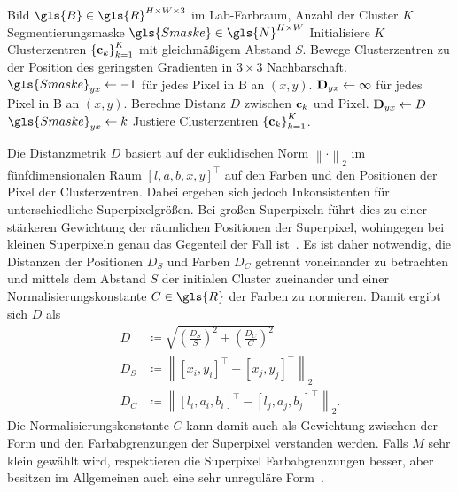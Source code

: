 \begin{algorithm}[t]
\centering
\begin{algorithmic}
  \REQUIRE{} Bild $\gls{B} \in \gls{R}^{H \times W \times 3}$ im Lab-Farbraum, Anzahl der Cluster $K$
  \ENSURE{} Segmentierungsmaske $\gls{Smaske} \in \gls{N}^{H \times W}$
  \STATE{} Initialisiere $K$ Clusterzentren ${\left\{\ve{c}_k\right\}}_{k=1}^K$ mit gleichmäßigem Abstand $S$.
  \STATE{} Bewege Clusterzentren zu der Position des geringsten Gradienten in $3 \times 3$ Nachbarschaft.
  \STATE{} $\gls{Smaske}_{yx} \leftarrow -1$ für jedes Pixel in \gls{B} an $\left(x,y\right)$.
  \STATE{} $\mathbf{D}_{yx} \leftarrow \infty$ für jedes Pixel in \gls{B} an $\left(x,y\right)$.
  \REPEAT{}
        \STATE{} Berechne Distanz $D$ zwischen $\mathbf{c}_k$ und Pixel.
          \STATE{} $\mathbf{D}_{yx} \leftarrow D$
          \STATE{} $\gls{Smaske}_{yx} \leftarrow k$
        \ENDIF{}
      \ENDFOR{}
    \ENDFOR{}
    \STATE{} Justiere Clusterzentren ${\left\{\ve{c}_k\right\}}_{k=1}^K$.
\end{algorithmic}
\caption[\gls{SLIC}]{}
\label{alg:slic}
\end{algorithm}

Die Distanzmetrik $D$ basiert auf der euklidischen Norm ${\left\|\cdot\right\|}_2$ im fünfdimensionalen Raum ${\left[l,a,b,x,y\right]}^{\top}$ auf den Farben und den Positionen der Pixel \bzw{} der Clusterzentren.
Dabei ergeben sich jedoch Inkonsistenten für unterschiedliche Superpixelgrößen.
Bei großen Superpixeln führt dies zu einer stärkeren Gewichtung der räumlichen Positionen der Superpixel, wohingegen bei kleinen Superpixeln genau das Gegenteil der Fall ist~\cite{slic}.
Es ist daher notwendig, die Distanzen der Positionen $D_S$ und Farben $D_C$ getrennt voneinander zu betrachten und mittels dem Abstand $S$ der initialen Cluster zueinander und einer Normalisierungskonstante $C \in \gls{R}$ \bzgl{} der Farben zu normieren.
Damit ergibt sich $D$ als~\cite{slic}
\begin{equation*}
\begin{split}
  D & \coloneqq \sqrt{{\left(\frac{D_S}{S}\right)}^2 + {\left(\frac{D_C}{C}\right)}^2}\\
  D_S & \coloneqq {\left\|{\left[x_i, y_i\right]}^{\top} - {\left[x_j, y_j\right]}^{\top}\right\|}_2\\
  D_C & \coloneqq {\left\|{\left[l_i, a_i, b_i\right]}^{\top} - {\left[l_j, a_j, b_j\right]}^{\top}\right\|}_2.
\end{split}
\end{equation*}
Die Normalisierungskonstante $C$ kann damit auch als Gewichtung zwischen der Form und den Farbabgrenzungen der Superpixel verstanden werden.
Falls $M$ sehr klein gewählt wird, respektieren die Superpixel Farbabgrenzungen besser, aber besitzen im Allgemeinen auch eine sehr unreguläre Form~\cite{slic}.

